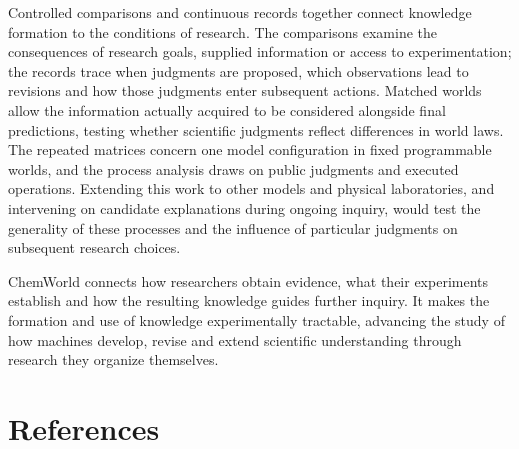 \documentclass[12pt,a4paper]{article}
\begin{document}
Controlled comparisons and continuous records together connect knowledge formation to the conditions of research. The comparisons examine the consequences of research goals, supplied information or access to experimentation; the records trace when judgments are proposed, which observations lead to revisions and how those judgments enter subsequent actions. Matched worlds allow the information actually acquired to be considered alongside final predictions, testing whether scientific judgments reflect differences in world laws. The repeated matrices concern one model configuration in fixed programmable worlds, and the process analysis draws on public judgments and executed operations. Extending this work to other models and physical laboratories, and intervening on candidate explanations during ongoing inquiry, would test the generality of these processes and the influence of particular judgments on subsequent research choices.

ChemWorld connects how researchers obtain evidence, what their experiments establish and how the resulting knowledge guides further inquiry. It makes the formation and use of knowledge experimentally tractable, advancing the study of how machines develop, revise and extend scientific understanding through research they organize themselves.

\clearpage
\onecolumn

\section{References}\label{references}
\end{document}
